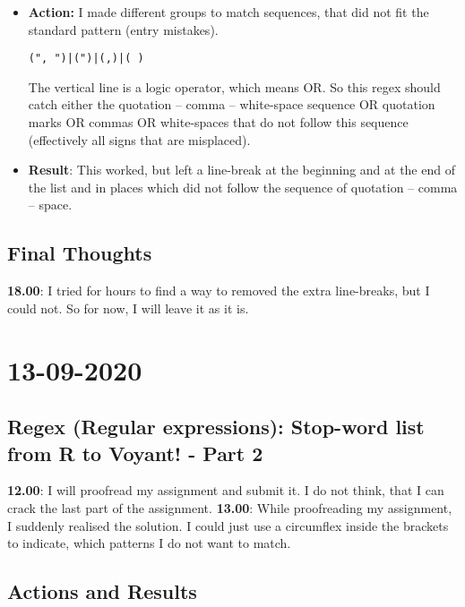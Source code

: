 \documentclass{article}
\begin{document}
\begin{itemize}
\item \textbf{Action:} I made different groups to match sequences, that did not fit the standard pattern (entry mistakes). 
\begin{verbatim}
(", ")|(")|(,)|( )
\end{verbatim}
The vertical line is a logic operator, which means OR. So this regex should catch either the quotation -- comma -- white-space sequence OR quotation marks OR commas OR white-spaces that do not follow this sequence (effectively all signs that are misplaced). 
\item \textbf{Result}: This worked, but left a line-break at the beginning and at the end of the list and in places which did not follow the sequence of quotation -- comma -- space.
\end{itemize}

\subsection{Final Thoughts}
\textbf{18.00}: I tried for hours to find a way to removed the extra line-breaks, but I could not. So for now, I will leave it as it is. 

\section{13-09-2020}
\subsection{Regex (Regular expressions): Stop-word list from R to Voyant! - Part 2}



\textbf{12.00}: I will proofread my assignment and submit it. I do not think, that I can crack the last part of the assignment.
\break{}
\break{}
\textbf{13.00}: While proofreading my assignment, I suddenly realised the solution. I could just use a circumflex inside the brackets to indicate, which patterns I do not want to match.

\subsection{Actions and Results}
\end{document}
